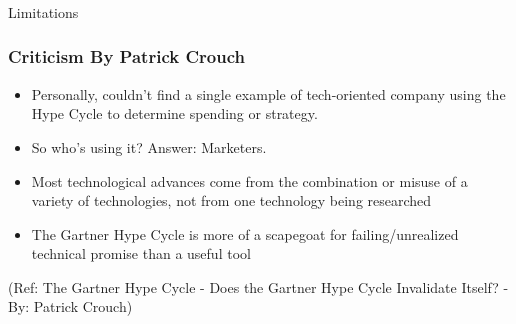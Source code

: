 


\begin{frame}[fragile]\frametitle{}
\begin{center}
{\Large Limitations}
\end{center}
\end{frame}


\begin{frame}[fragile]\frametitle{Criticism By Patrick Crouch}


\begin{itemize}
\item Personally, couldn’t find a single example of tech-oriented company using the Hype Cycle to determine spending or strategy.
\item So who’s using it? Answer: Marketers.
\item Most technological advances come from the combination or misuse of a variety of technologies, not from one technology being researched
\item The Gartner Hype Cycle is more of a scapegoat for failing/unrealized technical promise than a useful tool

\end{itemize}

{\tiny (Ref: The Gartner Hype Cycle - Does the Gartner Hype Cycle Invalidate Itself? - By: Patrick Crouch)}

\end{frame}

